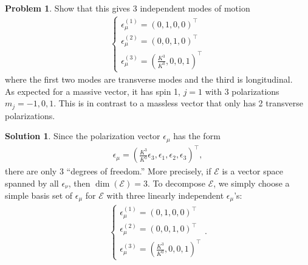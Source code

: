 \documentclass[a4paper,11pt]{article}
\numberwithin{equation}{section}
\theoremstyle{definition}
\newtheorem{prob}{Problem}[section]
\newtheorem{sln}{Solution}[section]
\begin{document}
\begin{prob}
	Show that this gives 3 independent modes of motion
	\begin{align}
	\begin{cases}
	\epsilon^{(1)}_\mu = (0,1,0,0)^\top\\
	\epsilon^{(2)}_\mu = (0,0,1,0)^\top\\
	\epsilon^{(3)}_\mu = \left(\frac{K^3}{K^0},0,0,1\right)^\top
	\end{cases}
	\end{align}
	where the first two modes are transverse modes and the third is longitudinal.\\
	
	As expected for a massive vector, it has spin 1, $j=1$ with 3 polarizations $m_j = -1,0,1$. This is in contrast to a massless vector that only has 2 transverse polarizations. \\
	
	\begin{sln}
		Since the polarization vector $\epsilon_\mu$ has the form
		\begin{align}
		\epsilon_\mu = \left(\frac{K^3}{K^0}\epsilon_3,\epsilon_1,\epsilon_2,\epsilon_3 \right)^\top,
		\end{align}
		there are only 3 ``degrees of freedom.'' More precisely, if $\mathcal{E}$ is a vector space spanned by all $\epsilon_\nu$, then $\dim(\mathcal{E}) = 3$. To decompose $\mathcal{E}$, we simply choose a simple basis set of $\epsilon_\mu$ for $\mathcal{E}$ with three linearly independent $\epsilon_\mu$'s:
		\begin{align}
		\begin{cases}
		\epsilon^{(1)}_\mu = (0,1,0,0)^\top\\
		\epsilon^{(2)}_\mu = (0,0,1,0)^\top\\
		\epsilon^{(3)}_\mu = \left(\frac{K^3}{K^0},0,0,1\right)^\top
		\end{cases}.
		\end{align}
	\end{sln}
\end{prob}
\end{document}
